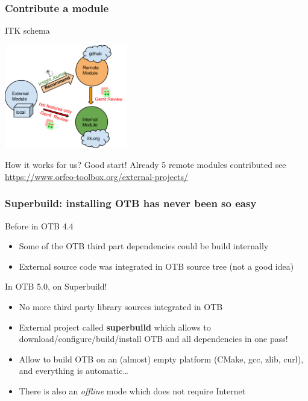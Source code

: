 \documentclass[8pt]{beamer}
\begin{document}
\begin{frame}
\frametitle{Contribute a module}
\begin{block}{ITK schema}
\begin{center}
 \includegraphics[width=0.4\textwidth]{images/itk-remote-module.png}
\end{center}

\end{block}
\begin{block}{How it works for us?}
Good start! Already 5 remote modules contributed see \url{https://www.orfeo-toolbox.org/external-projects/}
\end{block}
\end{frame}

\begin{frame}
\frametitle{Superbuild: installing OTB has never been so easy}
\begin{block}{Before in OTB 4.4}
\begin{itemize}
\item Some of the OTB third part dependencies could be build internally
\item External source code was integrated in OTB source tree (not a good idea)
\end{itemize}
\end{block}

\begin{block}{In OTB 5.0, on Superbuild!}
\begin{itemize}
\item No more third party library sources integrated in OTB
\item External project called \textbf{superbuild} which allows to
  download/configure/build/install OTB and all dependencies in one pass!
\item Allow to build OTB on an (almost) empty platform (CMake, gcc, zlib, curl),
  and everything is automatic\ldots
\item There is also an \textit{offline} mode which does not require Internet
\end{itemize}
\end{block}
\end{frame}
\end{document}
